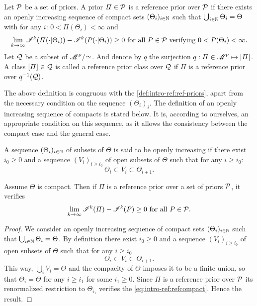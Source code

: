 \begin{defi}
    Let $\mathcal{P}$ be a set of priors. A prior $\varPi\in\mathcal{P}$ is a reference prior over $\mathcal{P}$ if there exists an openly increasing sequence of compact sets $(\Theta_i)_{i\in\mathbb{N}}$ such that $\bigcup_{i\in\mathbb{N}}\Theta_i=\Theta$ with for any $i$: $0<\varPi(\Theta_i)<\infty$ and
    \begin{equation}
        \lim_{k\rightarrow\infty}\sI^k(\varPi(\cdot|\Theta_i)) - \sI^k(P(\cdot|\Theta_i))  \geq 0 \text{\ for all\ } P\in\cP\text{\ verifying\ }0<P(\Theta_i)<\infty.
    \end{equation}
    Let $\mathcal{Q}$ be a subset of $\mathscr{M}^\nu/\!\simeq$.
    And denote by $q$ the surjection $q:\varPi\in\mathscr{M}^\nu\mapsto[\varPi]$.  
    A class $[\varPi]\in\mathcal{Q}$ is called a reference prior class over $\mathcal{Q}$ if $\varPi$ is a reference prior over $q^{-1}(\mathcal{Q})$.
\end{defi}



The above definition is congruous with the \cref{def:intro-ref:ref-priors}, apart from the necessary condition on the sequence $(\Theta_i)_i$. 
The definition of an openly increasing sequence of compacts
is stated below. It is, according to ourselves, an appropriate condition on this sequence, as it allows the consistency between the compact case and the general case.


\begin{defi}
    A sequence $(\Theta_i)_{i\in \mathbb{N}}$ of subsets of $\Theta$ is said to be openly increasing if there exist $i_0\geq0$ and a sequence $(V_i)_{i\geq i_0}$ of open subsets of $\Theta$ such that for any $i\geq i_0$:
    \begin{equation}
        \Theta_i\subset V_i\subset\Theta_{i+1}.
    \end{equation}
\end{defi}

\begin{prop}
    Assume $\Theta$ is compact. Then if $\varPi$ is a reference prior over a set of priors $\mathcal{P}$, it verifies
        \begin{equation}\label{eq:intro-ref:refcompact}
            \lim_{k\rightarrow\infty} \mathscr{I}^k(\varPi)-\mathscr{I}^k(P) \geq0\text{\ for all\ } P\in\mathcal{P}.
        \end{equation}
\end{prop}


\begin{proof} 
We consider an openly increasing sequence of compact sets $(\Theta_i)_{i\in\mathbb{N}}$ such that $\bigcup_{i\in\mathbb{N}}\Theta_i = \Theta$.
By definition there exist $i_0\geq0$ and a sequence $(V_i)_{i\geq i_0}$ of open subsets of $\Theta$  such that for any $i\geq i_0$
    \begin{equation}
        \Theta_i\subset V_i\subset \Theta_{i+1}.
    \end{equation}
This way, $\bigcup_iV_i=\Theta$ and the compacity of $\Theta$ imposes it to  be a finite union, so that $\Theta_i=\Theta$ for any $i\geq i_1$ for some $i_1\geq0$.
Since $\varPi$ is a reference prior over $\mathcal{P}$ its renormalized restriction to $\Theta_{i_1}$ verifies the \cref{eq:intro-ref:refcompact}. Hence the result.
\end{proof}


